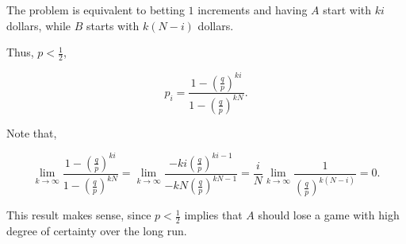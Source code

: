 The problem is equivalent to betting $1$ increments and having $A$ start with
$ki$ dollars, while $B$ starts with $k(N-i)$ dollars.

Thus, $p < \frac{1}{2}$,

$$p_{i} = \frac{1 - \left(\frac{q}{p}\right)^{ki}}{1 - \left(\frac{q}{p}\right)^
{kN}}.$$

Note that,

$$\lim_{k \to \infty} \frac{1 - \left(\frac{q}{p}\right)^{ki}}{1 - \left(
\frac{q}{p}\right)^{kN}} = \lim_{k \to \infty} \frac{-ki\left(\frac{q}{p}\right)
^{ki-1}}{-kN\left(\frac{q}{p}\right)^{kN-1}} = \frac{i}{N}\lim_{k \to \infty} 
\frac{1}{\left(\frac{q}{p}\right)^{k(N-i)}} = 0.$$

This result makes sense, since $p < \frac{1}{2}$ implies that $A$ should lose
a game with high degree of certainty over the long run.
